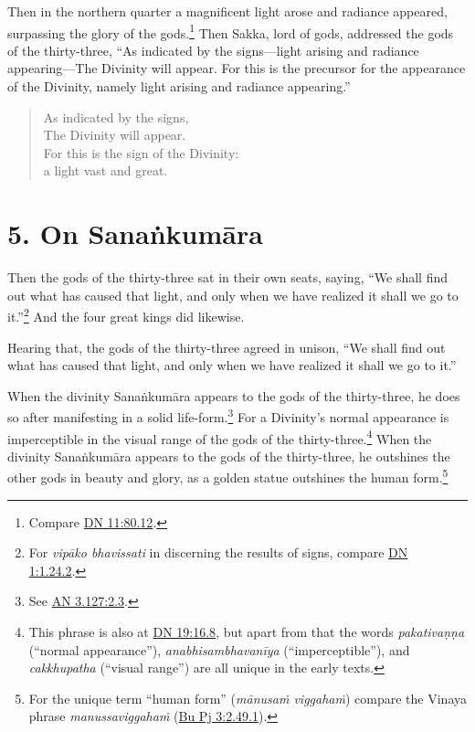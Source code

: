 \documentclass[12pt,openany]{book}%
\begin{document}
Then in the northern quarter a magnificent light arose and radiance appeared, surpassing the glory of the gods.\footnote{Compare \href{https://suttacentral.net/dn11/en/sujato\#80.12}{DN 11:80.12}. } Then Sakka, lord of gods, addressed the gods of the thirty-three, “As indicated by the signs—light arising and radiance appearing—The Divinity will appear. For this is the precursor for the appearance of the Divinity, namely light arising and radiance appearing.” 

\begin{verse}%
As indicated by the signs, \\
The Divinity will appear. \\
For this is the sign of the Divinity: \\
a light vast and great. 

%
\end{verse}

\section*{5. On \textsanskrit{Sanaṅkumāra} }

Then the gods of the thirty-three sat in their own seats, saying, “We shall find out what has caused that light, and only when we have realized it shall we go to it.”\footnote{For \textit{\textsanskrit{vipāko} bhavissati} in discerning the results of signs, compare \href{https://suttacentral.net/dn1/en/sujato\#1.24.2}{DN 1:1.24.2}. } And the four great kings did likewise. 

Hearing that, the gods of the thirty-three agreed in unison, “We shall find out what has caused that light, and only when we have realized it shall we go to it.” 

When the divinity \textsanskrit{Sanaṅkumāra} appears to the gods of the thirty-three, he does so after manifesting in a solid life-form.\footnote{See \href{https://suttacentral.net/an3.127/en/sujato\#2.3}{AN 3.127:2.3}. } For a Divinity’s normal appearance is imperceptible in the visual range of the gods of the thirty-three.\footnote{This phrase is also at \href{https://suttacentral.net/dn19/en/sujato\#16.8}{DN 19:16.8}, but apart from that the words \textit{\textsanskrit{pakativaṇṇa}} (“normal appearance”), \textit{\textsanskrit{anabhisambhavanīya}} (“imperceptible”), and \textit{cakkhupatha} (“visual range”) are all unique in the early texts. } When the divinity \textsanskrit{Sanaṅkumāra} appears to the gods of the thirty-three, he outshines the other gods in beauty and glory, as a golden statue outshines the human form.\footnote{For the unique term “human form” (\textit{\textsanskrit{mānusaṁ} \textsanskrit{viggahaṁ}}) compare the Vinaya phrase \textit{\textsanskrit{manussaviggahaṁ}} (\href{https://suttacentral.net/pli-tv-bu-vb-pj3/en/sujato\#2.49.1}{Bu Pj 3:2.49.1}). } 
\end{document}
